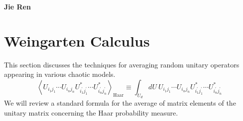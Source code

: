 \documentclass{SciPost}
\begin{document}
\pagestyle{SPstyle}

\begin{center}{\Large \textbf{\color{scipostdeepblue}{
Information Scrambling in Chaotic Systems\\
}}}\end{center}

\begin{center}
\textbf{Jie Ren}
\end{center}

\tableofcontents

\section{Weingarten Calculus}

This section discusses the techniques for averaging random unitary operators appearing in various chaotic models.
\begin{equation}
	\left\langle U_{i_1 j_1} \cdots U_{i_n j_n} U_{i_1^{\prime} j_1^{\prime}}^* \cdots U_{i_n^{\prime} j_n^{\prime}}^* \right\rangle_\text{Haar}
	\equiv \int_{U_d} dU \ U_{i_1 j_1} \cdots U_{i_n j_n} U_{i_1^{\prime} j_1^{\prime}}^* \cdots U_{i_n^{\prime} j_n^{\prime}}^*
\end{equation}
We will review a standard formula for the average of matrix elements of the unitary matrix concerning the Haar probability measure.
\end{document}
